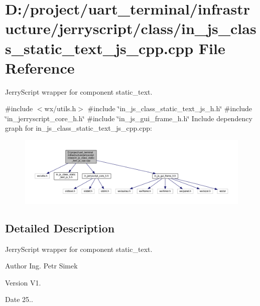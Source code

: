 \section{D\+:/project/uart\+\_\+terminal/infrastructure/jerryscript/class/in\+\_\+js\+\_\+class\+\_\+static\+\_\+text\+\_\+js\+\_\+cpp.cpp File Reference}
\label{in__js__class__static__text__js__cpp_8cpp}


Jerry\+Script wrapper for component static\+\_\+text.  


{\ttfamily \#include $<$wx/utils.\+h$>$}\newline
{\ttfamily \#include \char`\"{}in\+\_\+js\+\_\+class\+\_\+static\+\_\+text\+\_\+js\+\_\+h.\+h\char`\"{}}\newline
{\ttfamily \#include \char`\"{}in\+\_\+jerryscript\+\_\+core\+\_\+h.\+h\char`\"{}}\newline
{\ttfamily \#include \char`\"{}in\+\_\+js\+\_\+gui\+\_\+frame\+\_\+h.\+h\char`\"{}}\newline
Include dependency graph for in\+\_\+js\+\_\+class\+\_\+static\+\_\+text\+\_\+js\+\_\+cpp.\+cpp\+:\nopagebreak
\begin{figure}[H]
\begin{center}
\leavevmode
\includegraphics[width=350pt]{in__js__class__static__text__js__cpp_8cpp__incl}
\end{center}
\end{figure}


\subsection{Detailed Description}
Jerry\+Script wrapper for component static\+\_\+text. 

\begin{DoxyAuthor}{Author}
Ing. Petr Simek 
\end{DoxyAuthor}
\begin{DoxyVersion}{Version}
V1. 
\end{DoxyVersion}
\begin{DoxyDate}{Date}
25.. 
\end{DoxyDate}
